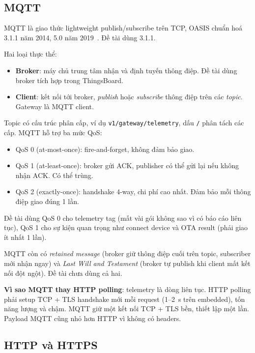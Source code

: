 \subsection{MQTT}

MQTT là giao thức lightweight publish/subscribe trên TCP, OASIS chuẩn hoá 3.1.1 năm 2014, 5.0 năm 2019~\cite{mqtt-spec}. Đề tài dùng 3.1.1.

Hai loại thực thể:

\begin{itemize}
    \item \textbf{Broker}: máy chủ trung tâm nhận và định tuyến thông điệp. Đề tài dùng broker tích hợp trong ThingsBoard.
    \item \textbf{Client}: kết nối tới broker, \textit{publish} hoặc \textit{subscribe} thông điệp trên các \textit{topic}. Gateway là MQTT client.
\end{itemize}



Topic có cấu trúc phân cấp, ví dụ \texttt{v1/gateway/telemetry}, dấu \texttt{/} phân tách các cấp. MQTT hỗ trợ ba mức QoS:

\begin{itemize}
    \item QoS 0 (at-most-once): fire-and-forget, không đảm bảo giao.
    \item QoS 1 (at-least-once): broker gửi ACK, publisher có thể gửi lại nếu không nhận ACK. Có thể trùng.
    \item QoS 2 (exactly-once): handshake 4-way, chi phí cao nhất. Đảm bảo mỗi thông điệp giao đúng 1 lần.
\end{itemize}

Đề tài dùng QoS 0 cho telemetry tag (mất vài gói không sao vì có báo cáo liên tục), QoS 1 cho sự kiện quan trọng như connect device và OTA result (phải giao ít nhất 1 lần).

MQTT còn có \textit{retained message} (broker giữ thông điệp cuối trên topic, subscriber mới nhận ngay) và \textit{Last Will and Testament} (broker tự publish khi client mất kết nối đột ngột). Đề tài chưa dùng cả hai.

\textbf{Vì sao MQTT thay HTTP polling}: telemetry là dòng liên tục. HTTP polling phải setup TCP + TLS handshake mới mỗi request (1--2~s trên embedded), tốn năng lượng và chậm. MQTT giữ một kết nối TCP + TLS bền, thiết lập một lần. Payload MQTT cũng nhỏ hơn HTTP vì không có headers.

\subsection{HTTP và HTTPS}

